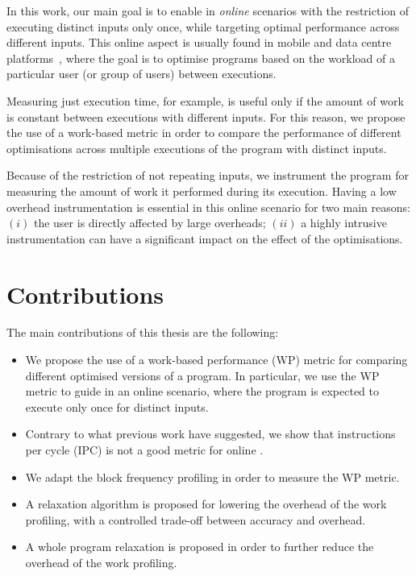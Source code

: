 In this work, our main goal is to enable {\itercomp} in \textit{online} scenarios with the restriction of executing distinct inputs only once, while targeting optimal performance across different inputs.
This online aspect is usually found in mobile and data centre platforms~\citep{chen12b,fang15,mpeis16}, where the goal is to optimise programs based on the workload of a particular user (or group of users) between executions.

Measuring just execution time, for example, is useful only if the amount of work is constant between executions with different inputs.
For this reason, we propose the use of a work-based metric in order to compare the performance of different optimisations across multiple executions of the program with distinct inputs.

Because of the restriction of not repeating inputs, we instrument the program for measuring the amount of work it performed during its execution.
Having a low overhead instrumentation is essential in this online scenario for two main reasons:
$(i)$ the user is directly affected by large overheads;
$(ii)$ a highly intrusive instrumentation can have a significant impact on the effect of the optimisations.

\section{Contributions}


The main contributions of this thesis are the following:
\begin{itemize}
\item We propose the use of a work-based performance (WP) metric for comparing different optimised versions of a program.
      In particular, we use the WP metric to guide {\itercomp} in an online scenario, where the program is expected to execute only once for distinct inputs.
\item Contrary to what previous work have suggested, we show that instructions per cycle (IPC) is not a good metric for online {\itercomp}.
\item We adapt the block frequency profiling in order to measure the WP metric.
\item A relaxation algorithm is proposed for lowering the overhead of the work profiling, with a controlled trade-off between accuracy and overhead.
\item A whole program relaxation is proposed in order to further reduce the overhead of the work profiling.

\end{itemize}
